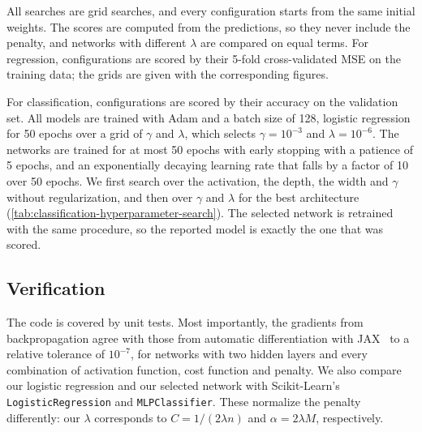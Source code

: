 All searches are grid searches, and every configuration starts from the same initial weights.
The scores are computed from the predictions, so they never include the penalty, and networks
with different $\lambda$ are compared on equal terms. For regression, configurations are scored
by their 5-fold cross-validated MSE on the training data; the grids are given with the
corresponding figures.

For classification, configurations are scored by their accuracy on the validation set. All
models are trained with Adam and a batch size of 128, logistic regression for 50 epochs over a
grid of $\gamma$ and $\lambda$, which selects $\gamma = 10^{-3}$ and $\lambda = 10^{-6}$. The networks are trained for at most 50 epochs with early
stopping with a patience of 5 epochs, and an exponentially decaying learning rate that falls by
a factor of 10 over 50 epochs. We first search over the activation, the depth, the width and
$\gamma$ without regularization, and then over $\gamma$ and $\lambda$ for the best architecture
(\cref{tab:classification-hyperparameter-search}). The selected network is retrained with the
same procedure, so the reported model is exactly the one that was scored.

\subsection{Verification}\label{subsec:verification}

The code is covered by unit tests. Most importantly, the gradients from backpropagation agree
with those from automatic differentiation with JAX~\cite{bradbury_2018} to a relative tolerance
of $10^{-7}$, for networks with two hidden layers and every combination of activation function,
cost function and penalty. We also compare our logistic regression and our selected network with
Scikit-Learn's \texttt{LogisticRegression} and \texttt{MLPClassifier}. These normalize the
penalty differently: our $\lambda$ corresponds to $C = 1/(2\lambda n)$ and
$\alpha = 2\lambda M$, respectively.
